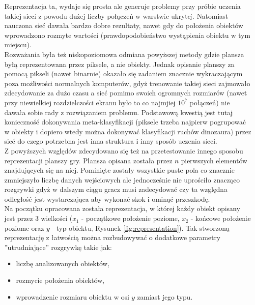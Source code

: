 \documentclass[11pt]{article} %
\begin{document}
Reprezentacja ta, wydaje się prosta ale generuje problemy przy próbie uczenia takiej sieci z powodu dużej liczby połączeń w warstwie ukrytej. Natomiast nauczona sieć dawała bardzo dobre rezultaty, nawet gdy do położenia obiektów wprowadzono rozmyte wartości (prawdopodobieństwo wystąpienia obiektu w tym miejscu). \\

Rozważania była też niskopoziomowa odmiana powyższej metody gdzie plansza byłą reprezentowana przez piksele, a nie obiekty. Jednak opisanie planszy za pomocą pikseli (nawet binarnie) okazało się zadaniem znacznie wykraczającym poza możliwości normalnych komputerów, gdyż trenowanie takiej sieci zajmowało zdecydowanie za dużo czasu a sieć pomimo swoich ogromnych rozmiarów (nawet przy niewielkiej rozdzielczości ekranu było to co najmjiej $10^7$ połączeń) nie dawała sobie rady z rozwiązaniem problemu. Podstawową kwestią jest tutaj konieczność dokonywania meta-klasyfikacji (piksele trzeba najpierw pogrupować w obiekty i dopiero wtedy można dokonywać klasyfikacji ruchów dinozaura) przez sieć do czego potrzebna jest inna struktura i inny sposób uczenia sieci. \\

Z powyższych względów zdecydowano się też na przetestowanie innego sposobu reprezentacji planszy gry. Plansza opisana została przez $n$ pierwszych elementów znajdujących się na niej. Pominięte zostały wszystkie puste pola co znacznie zmniejszyło liczbę danych wejściowych ale jednocześnie nie uprościło znacząco rozgrywki gdyż w dalszym ciągu gracz musi zadecydować czy ta względna odległość jest wystarczająca aby wykonać skok i ominąć przeszkodę. \\

Na początku opracowana została reprezentacja, w której każdy obiekt opisany jest przez 3 wielkości ($x_1$ - początkowe położenie poziome, $x_2$ - końcowe położenie poziome oraz $y$ - typ obiektu, Rysunek \ref{fig:representation}). Tak stworzoną reprezentację z łatwością można rozbudowywać o dodatkowe parametry ''utrudniające'' rozgrywkę takie jak: 

\begin{itemize}
\item liczbę analizowanych obiektów,

\item rozmycie położenia obiektów,

\item wprowadzenie rozmiaru obiektu w osi $y$ zamiast jego typu.

\end{itemize} 
\end{document}
